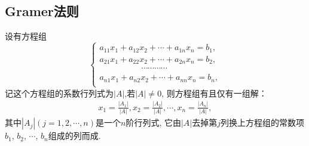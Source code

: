 \subsection{Gramer法则}

\begin{theorem}[Gramer法则]
  设有方程组
  \begin{equation}\label{eq:1-1}
    \begin{cases}
      a_{11}x_1+a_{12}x_2+\cdots+a_{1n}x_n=b_1,\\
      a_{21}x_1+a_{22}x_2+\cdots+a_{2n}x_n=b_2,\\
      \hspace{5em}\cdots\cdots\cdots\cdots\\
      a_{n1}x_1+a_{n2}x_2+\cdots+a_{nn}x_n=b_n,\\
    \end{cases}
  \end{equation}
  记这个方程组的系数行列式为$|A|$,若$|A|\neq 0$, 则方程组有且仅有一组解：
  \begin{align}\label{eq:1-2}
    x_1=\frac{|A_1|}{|A|},x_2=\frac{|A_2|}{|A|},
    \cdots,x_n=\frac{|A_n|}{|A|},
  \end{align}
  其中$|A_j|(j=1,2,\cdots,n)$是一个$n$阶行列式,
  它由$|A|$去掉第$j$列换上方程组的常数项$b_1$, $b_2$, $\cdots$, $b_n$组成的列而成.
\end{theorem}

